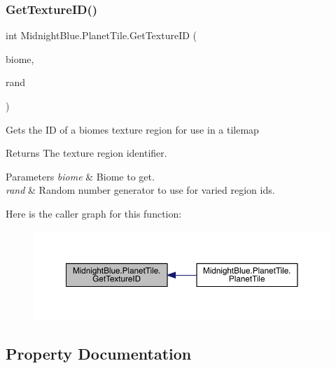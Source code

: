 \subsubsection{\texorpdfstring{Get\+Texture\+I\+D()}{GetTextureID()}}
{\footnotesize\ttfamily int Midnight\+Blue.\+Planet\+Tile.\+Get\+Texture\+ID (\begin{DoxyParamCaption}\item[{\hyperlink{namespace_midnight_blue_a8a6ba5637b64c3eb991f00d48decf381}{Biome}}]{biome,  }\item[{Random}]{rand }\end{DoxyParamCaption})\hspace{0.3cm}{\ttfamily [inline]}}



Gets the ID of a biomes texture region for use in a tilemap 

\begin{DoxyReturn}{Returns}
The texture region identifier.
\end{DoxyReturn}

\begin{DoxyParams}{Parameters}
{\em biome} & Biome to get.\\
\hline
{\em rand} & Random number generator to use for varied region id\textquotesingle{}s.\\
\hline
\end{DoxyParams}
Here is the caller graph for this function\+:
\nopagebreak
\begin{figure}[H]
\begin{center}
\leavevmode
\includegraphics[width=350pt]{class_midnight_blue_1_1_planet_tile_a0ba5d9886790e8f8d9e54e1873d5565b_icgraph}
\end{center}
\end{figure}


\subsection{Property Documentation}
\hypertarget{class_midnight_blue_1_1_planet_tile_a56f9f50efa0b740b3ce229cb4170fd97}{}\label{class_midnight_blue_1_1_planet_tile_a56f9f50efa0b740b3ce229cb4170fd97} 
